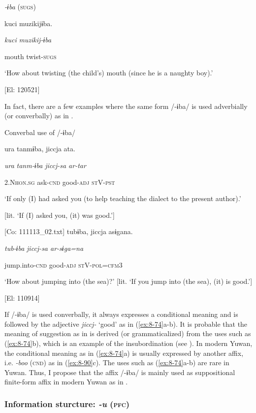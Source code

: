\ea\label{ex:8-73}
  \textit{{}-ɨba} (\textsc{sugs})

  {\TM}
\glll  kuci  muzikijɨba.

    \textit{kuci}  \textit{muzikij-ɨba}

    mouth  twist-\textsc{sugs}

    ‘How about twisting (the child’s) mouth (since he is a naughty boy).’

    [El: 120521]

In fact, there are a few examples where the same form /-ɨba/ is used adverbially (or converbally) as in .

\ea\label{ex:8-74}
  Converbal use of /-ɨba/

\ea {\TM}
\glll  ura  tanmɨba,  jiccja  ata.

      \textit{ura}  \textit{tanm-ɨba}  \textit{jiccj{}-sa  ar-tar}

      2.N\textsc{hon}.\textsc{sg}  ask-\textsc{cnd}  good-\textsc{adj}  \textsc{st}V-\textsc{pst}

\glt ‘If only (I) had asked you (to help teaching the dialect to the present author).’

[lit. ‘If (I) asked you, (it) was good.’]

      [Co: 111113\_02.txt]
\ex {\TM}
\glll  tubɨba,  jiccja  asɨgana.

      \textit{tub-ɨba}  \textit{jiccj{}-sa  ar-sɨga=na}

      jump.into-\textsc{cnd}  good-\textsc{adj}  \textsc{st}V-\textsc{pol}=\textsc{cfm}3

\glt ‘How about jumping into (the sea)?’ [lit. ‘If you jump into (the sea), (it) is good.’]

      [El: 110914]

If /-ɨba/ is used converbally, it always expresses a conditional meaning and is followed by the adjective \textit{jiccj-} ‘good’ as in (\ref{ex:8-74}a-b). It is probable that the meaning of suggestion as in  is derived (or grammaticalized) from the uses such as (\ref{ex:8-74}b), which is an example of the insubordination (see ). In modern Yuwan, the conditional meaning as in (\ref{ex:8-74}a) is usually expressed by another affix, i.e. \textit{{}-boo} (\textsc{cnd}) as in (\ref{ex:8-90}c). The uses such as (\ref{ex:8-74}a-b) are rare in Yuwan. Thus, I propose that the affix /-ɨba/ is mainly used as suppositional finite-form affix in modern Yuwan as in .

\subsubsection{Information sturcture: \textit{{}-u} (\textsc{pfc})}

